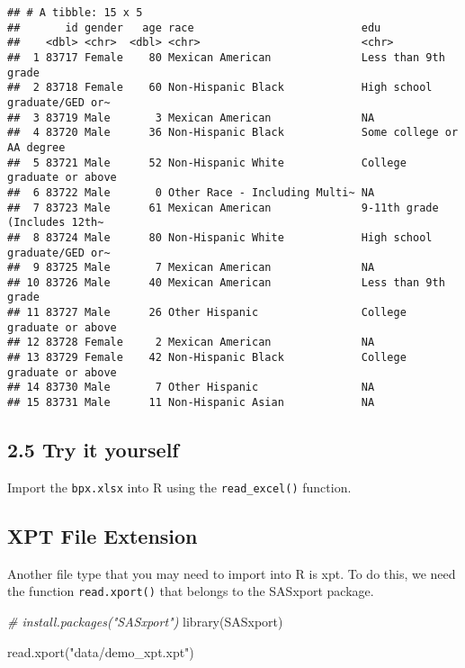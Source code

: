 \documentclass[
]{book}
\newenvironment{Shaded}{\begin{snugshade}}{\end{snugshade}}
\newcommand{\CommentTok}[1]{\textcolor[rgb]{0.56,0.35,0.01}{\textit{#1}}}
\newcommand{\FunctionTok}[1]{\textcolor[rgb]{0.00,0.00,0.00}{#1}}
\newcommand{\NormalTok}[1]{#1}
\newcommand{\StringTok}[1]{\textcolor[rgb]{0.31,0.60,0.02}{#1}}
\begin{document}
\begin{verbatim}
## # A tibble: 15 x 5
##       id gender   age race                          edu                         
##    <dbl> <chr>  <dbl> <chr>                         <chr>                       
##  1 83717 Female    80 Mexican American              Less than 9th grade         
##  2 83718 Female    60 Non-Hispanic Black            High school graduate/GED or~
##  3 83719 Male       3 Mexican American              NA                          
##  4 83720 Male      36 Non-Hispanic Black            Some college or AA degree   
##  5 83721 Male      52 Non-Hispanic White            College graduate or above   
##  6 83722 Male       0 Other Race - Including Multi~ NA                          
##  7 83723 Male      61 Mexican American              9-11th grade (Includes 12th~
##  8 83724 Male      80 Non-Hispanic White            High school graduate/GED or~
##  9 83725 Male       7 Mexican American              NA                          
## 10 83726 Male      40 Mexican American              Less than 9th grade         
## 11 83727 Male      26 Other Hispanic                College graduate or above   
## 12 83728 Female     2 Mexican American              NA                          
## 13 83729 Female    42 Non-Hispanic Black            College graduate or above   
## 14 83730 Male       7 Other Hispanic                NA                          
## 15 83731 Male      11 Non-Hispanic Asian            NA
\end{verbatim}

\hypertarget{try-it-yourself-13}{%
\subsection{2.5 Try it yourself}\label{try-it-yourself-13}}

Import the \texttt{bpx.xlsx} into R using the \texttt{read\_excel()} function.

\hypertarget{xpt-file-extension}{%
\subsection{XPT File Extension}\label{xpt-file-extension}}

Another file type that you may need to import into R is xpt. To do this, we need the function \texttt{read.xport()} that belongs to the SASxport package.

\begin{Shaded}
\begin{Highlighting}[]
\CommentTok{\# install.packages("SASxport")}
\FunctionTok{library}\NormalTok{(SASxport)}

\FunctionTok{read.xport}\NormalTok{(}\StringTok{"data/demo\_xpt.xpt"}\NormalTok{)}
\end{Highlighting}
\end{Shaded}
\end{document}
